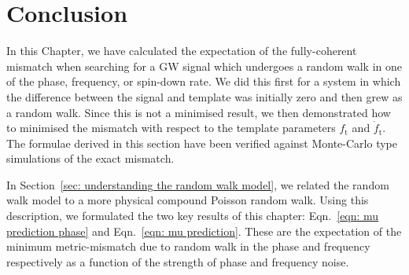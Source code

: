 \documentclass[../full_thesis/full_thesis.tex]{subfiles}
\newcommand{\thisdir}{../analytic_timing_noise_cgw}
\begin{document}
%


\section{Conclusion}

In this Chapter, we have calculated the expectation of the fully-coherent
mismatch when searching for a GW signal which undergoes a random walk in one of
the phase, frequency, or spin-down rate. We did this first for a system in
which the difference between the signal and template was initially zero and
then grew as a random walk. Since this is not a minimised result, we then
demonstrated how to minimised the mismatch with respect to the template
parameters $f_\textrm{t}$ and $\dot{f}_\textrm{t}$. The formulae derived in
this section have been verified against Monte-Carlo type simulations of the exact
mismatch.

In Section~\ref{sec: understanding the random walk model}, we related the
random walk model to a more physical compound Poisson random walk. Using this
description, we formulated the two key results of this chapter:
Eqn.~\eqref{eqn: mu prediction phase} and Eqn.~\eqref{eqn: mu prediction}.
These are the expectation of the minimum metric-mismatch due to random walk in
the phase and frequency respectively as a function of the strength of phase and
frequency noise.
\end{document}
